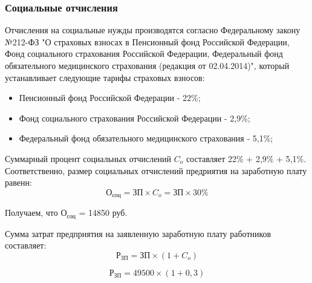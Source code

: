 \documentclass[a4paper]{extarticle}
\numberwithin{equation}{section}
\begin{document}
\subsubsection{Социальные отчисления}
Отчисления на социальные нужды производятся согласно Федеральному закону №212-ФЗ "О страховых взносах в Пенсионный фонд Российской Федерации, Фонд социального страхования Российской Федерации, Федеральный фонд обязательного медицинского страхования (редакция от 02.04.2014)", который устанавливает следующие тарифы страховых взносов:
\begin{itemize}
  \item Пенсионный фонд Российской Федерации - 22\%;
  \item Фонд социального страхования Российской Федерации - 2,9\%;
  \item Федеральный фонд обязательного медицинского страхования - 5,1\%;
\end{itemize}\par
Суммарный процент социальных отчислений $C_o$ составляет 22\% + 2,9\% + 5,1\%. Соответственно, размер социальных отчислений предриятия на заработную плату равенн:
\begin{equation}
\label{form3}
	\text{О}_\text{соц} = \text{ЗП}\times C_o = \text{ЗП}\times 30\%
\end{equation}\par
Получаем, что $\text{О}_\text{соц}$ = 14850 руб.\par
Сумма затрат предприятия на заявленную заработную плату работников составляет:
\begin{equation}
\label{form4}
	\text{Р}_\text{ЗП}=\text{ЗП}\times(1+C_o)
\end{equation}

\begin{equation}
\label{form5}
	\text{Р}_\text{ЗП}=49500\times(1+0,3)
\end{equation}\par
\end{document}
